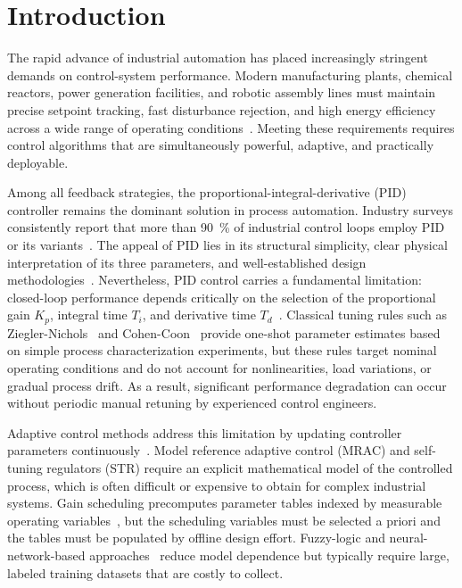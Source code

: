 \documentclass[conference,a4paper]{IEEEtran}[2015/08/26]
\begin{document}
\IEEEpeerreviewmaketitle

\section{Introduction}
\label{sec:introduction}

The rapid advance of industrial automation has placed increasingly
stringent demands on control-system performance. Modern manufacturing
plants, chemical reactors, power generation facilities, and robotic
assembly lines must maintain precise setpoint tracking, fast disturbance
rejection, and high energy efficiency across a wide range of operating
conditions~\cite{Franklin2018,Ogata2010}. Meeting these requirements
requires control algorithms that are simultaneously powerful, adaptive,
and practically deployable.

Among all feedback strategies, the proportional-integral-derivative
(PID) controller remains the dominant solution in process automation.
Industry surveys consistently report that more than \SI{90}{\percent} of
industrial control loops employ PID or its variants~\cite{Astrom1995}.
The appeal of PID lies in its structural simplicity, clear physical
interpretation of its three parameters, and well-established design
methodologies~\cite{ODwyer2006}. Nevertheless, PID control carries a
fundamental limitation: closed-loop performance depends critically on the
selection of the proportional gain $K_p$, integral time $T_i$, and
derivative time $T_d$~\cite{Ziegler1942}. Classical tuning rules such as
Ziegler-Nichols~\cite{Ziegler1942} and Cohen-Coon~\cite{Cohen1953}
provide one-shot parameter estimates based on simple process
characterization experiments, but these rules target nominal operating
conditions and do not account for nonlinearities, load variations, or
gradual process drift. As a result, significant performance degradation
can occur without periodic manual retuning by experienced control
engineers.

Adaptive control methods address this limitation by updating controller
parameters continuously~\cite{Astrom2013,Ioannou2012,Landau2011}. Model
reference adaptive control (MRAC) and self-tuning regulators (STR)
require an explicit mathematical model of the controlled process,
which is often difficult or expensive to obtain for complex industrial
systems. Gain scheduling precomputes parameter tables indexed by
measurable operating variables~\cite{Rugh2000}, but the scheduling
variables must be selected a priori and the tables must be populated
by offline design effort. Fuzzy-logic and neural-network-based
approaches~\cite{Hunt1992,Qin1993} reduce model dependence but typically
require large, labeled training datasets that are costly to collect.
\end{document}

